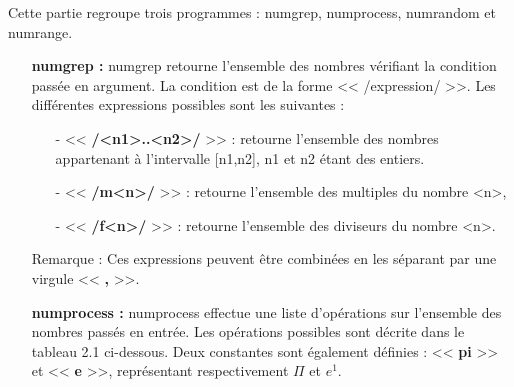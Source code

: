 Cette partie regroupe trois programmes : numgrep, numprocess, numrandom et numrange.
\newline
\begin{itemize}
 \item[\textbullet] \textbf{numgrep :} numgrep retourne l'ensemble des nombres v\'erifiant la condition pass\'ee en argument. La condition est de la
forme << /expression/ >>. Les diff\'erentes expressions possibles sont les suivantes :
  \begin{itemize}
  \item[-] << \textbf{/<n1>..<n2>/} >> : retourne l'ensemble des nombres appartenant \`a l'intervalle [n1,n2], n1 et n2 \'etant des entiers.
  \item[-] << \textbf{/m<n>/} >> : retourne l'ensemble des multiples du nombre <n>,
  \item[-] << \textbf{/f<n>/} >> : retourne l'ensemble des diviseurs du nombre <n>.
  \end{itemize}
Remarque : Ces expressions peuvent \^etre combin\'ees en les s\'eparant par une virgule << \textbf{,} >>.
\newline
 \item[\textbullet] \textbf{numprocess :} numprocess effectue une liste d'op\'erations sur l'ensemble des nombres pass\'es en entr\'ee.
Les op\'erations possibles sont d\'ecrite dans le tableau 2.1 ci-dessous. Deux constantes sont \'egalement d\'efinies : << \textbf{pi} >> 
et << \textbf{e} >>, repr\'esentant respectivement $\Pi$ et $e^1$.
\begin{table}[h]
\begin{center}


\end{center}
\end{table}
\end{itemize}
